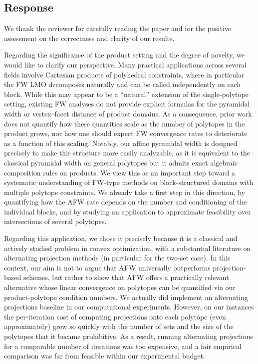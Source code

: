 \documentclass[a4wide]{article}
\begin{document}
\subsection*{Response}

We thank the reviewer for carefully reading the paper and for the positive assessment on the correctness and clarity of our results.

Regarding the significance of the product setting and the degree of novelty, we would like to clarify our perspective. Many practical applications across several fields involve Cartesian products of polyhedral constraints, where in particular the FW LMO decomposes naturally and can be called independently on each block. 
While this may appear to be a ``natural'' extension of the single-polytope setting, existing FW analyses do not provide explicit formulas for the pyramidal width or vertex–facet distance of product domains. As a consequence, prior work does not quantify how these quantities scale as the number of polytopes in the product grows, nor how one should expect FW convergence rates to deteriorate as a function of this scaling.
Notably, our affine pyramidal width is designed precisely to make this structure more easily analyzable, as it is equivalent to the classical pyramidal width on general polytopes but it admits exact algebraic composition rules on products.
We view this as an important step toward a systematic understanding of FW-type methods on block-structured domains with multiple polytope constraints. We already take a first step in this direction, by quantifying how the AFW rate depends on the number and conditioning of the individual blocks, and by studying an application to approximate feasibility over intersections of several polytopes.

Regarding this application, we chose it precisely because it is a classical and actively studied problem in convex optimization, with a substantial literature on alternating projection methods (in particular for the two-set case). In this context, our aim is not to argue that AFW universally outperforms projection-based schemes, but rather to show that AFW offers a practically relevant alternative whose linear convergence on polytopes can be quantified via our product-polytope condition numbers. We actually did implement an alternating projections baseline in our computational experiments. However, on our instances the per-iteration cost of computing projections onto each polytope (even approximately) grew so quickly with the number of sets and the size of the polytopes that it became prohibitive. As a result, running alternating projections for a comparable number of iterations was too expensive, and a fair empirical comparison was far from feasible within our experimental budget.
\end{document}
